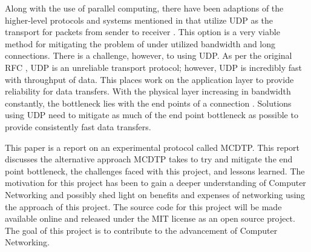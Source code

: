 Along with the use of parallel computing, there have been adaptions of the higher-level protocols and systems mentioned in \cite{Fan2010} that utilize UDP as the transport for packets from sender to receiver \cite{He2002}\cite{Aspera2016}\cite{Fan2010}\cite{Meiss2007}\cite{gu2007udt}. This option is a very viable method for mitigating the problem of under utilized bandwidth and long connections. There is a challenge, however, to using UDP. As per the original RFC \cite{postel1980user}, UDP is an unreliable transport protocol; however, UDP is incredibly fast with throughput of data. This places work on the application layer to provide reliability for data transfers. With the physical layer increasing in bandwidth constantly, the bottleneck lies with the end points of a connection \cite{Aspera2016}\cite{Fan2010}. Solutions using UDP need to mitigate as much of the end point bottleneck as possible to provide consistently fast data transfers.

This paper is a report on an experimental protocol called MCDTP. This report discusses the alternative approach MCDTP takes to try and mitigate the end point bottleneck, the challenges faced with this project, and lessons learned. The motivation for this project has been to gain a deeper understanding of Computer Networking and possibly shed light on benefits and expenses of networking using the approach of this project. The source code for this project will be made available online and released under the MIT license as an open source project. The goal of this project is to contribute to the advancement of Computer Networking.
